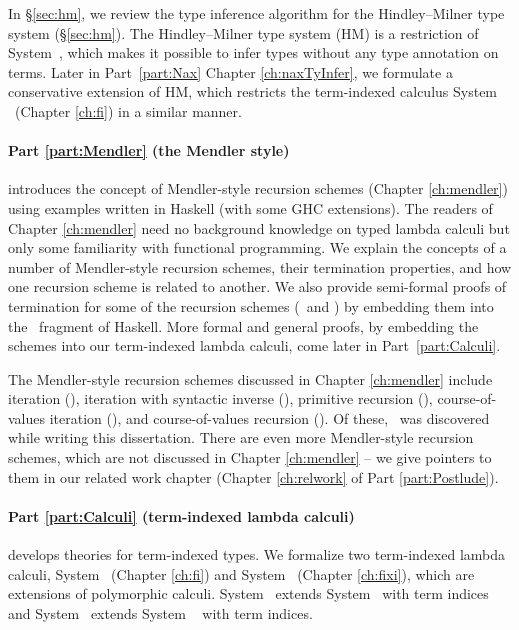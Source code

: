 In \S\ref{sec:hm}, we review the type inference algorithm for
the Hindley--Milner type system (\S\ref{sec:hm}).
The Hindley--Milner type system (HM) is a restriction of System~\F,
which makes it possible to infer types without any type annotation on terms.
Later in Part~\ref{part:Nax} Chapter \ref{ch:naxTyInfer},
we formulate a conservative extension of HM, which restricts
the term-indexed calculus System \Fi\ (Chapter \ref{ch:fi}) in a similar manner.

\paragraph{Part \ref{part:Mendler} (the Mendler style)}\hspace{-1em} introduces
the concept of Mendler-style recursion schemes (Chapter \ref{ch:mendler})
using examples written in Haskell (with some GHC extensions). The readers
of Chapter \ref{ch:mendler} need no background knowledge
on typed lambda calculi but only some familiarity with functional programming.
We explain the concepts of a number of Mendler-style recursion schemes,
their termination properties, and how one recursion scheme is related to
another. We also provide semi-formal proofs of termination for some of
the recursion schemes (\MIt\ and \MsfIt) by embedding them into
the \Fw\ fragment of Haskell. More formal and general proofs,
by embedding the schemes into our term-indexed lambda calculi,
come later in Part~\ref{part:Calculi}.

The Mendler-style recursion schemes discussed in Chapter \ref{ch:mendler}
include iteration (\MIt), iteration with syntactic inverse (\MsfIt),
primitive recursion (\MPr), course-of-values iteration (\McvIt),
and course-of-values recursion (\McvPr). Of these, \MsfIt\ was discovered
while writing this dissertation.
There are even more Mendler-style recursion schemes, which are not
discussed in Chapter \ref{ch:mendler} -- we give pointers to them in our
related work chapter (Chapter \ref{ch:relwork} of Part \ref{part:Postlude}).

\paragraph{Part \ref{part:Calculi} (term-indexed lambda calculi)}\hspace{-1em}
develops theories for term-indexed types.
We formalize two term-indexed lambda calculi,
System \Fi\ (Chapter \ref{ch:fi}) and System \Fixi\ (Chapter \ref{ch:fixi}),
which are extensions of polymorphic calculi.
System \Fi\ extends System \Fw\ with term indices and
System \Fixi\ extends System \Fixw\ \cite{AbeMat04} with term indices.

